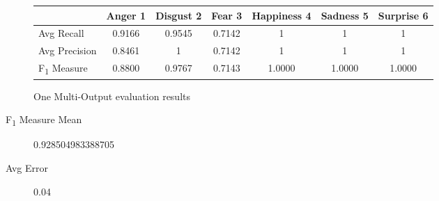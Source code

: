 \documentclass[a4paper,11pt]{article}
\begin{document}
 \begin{figure}[h]                                                               
 \begin{center}                                                                  
 \begin{tabular}{ | l || c | c | c | c | c | c | }                               
     \hline                                                                      
           							& Anger 1 & Disgust 2 & Fear 3 & Happiness 4 & Sadness 5 & Surprise 6 \\ \hline \hline
         Avg Recall 				& 0.9166 & 0.9545 & 0.7142 & 1 & 1 & 1 \\ \hline   
         Avg Precision 				& 0.8461 & 1 & 0.7142 & 1 & 1 & 1 \\ \hline
         F\textsubscript{1} Measure & 0.8800 & 0.9767 & 0.7143 &  1.0000 &  1.0000 & 1.0000 \\ \hline
     \end{tabular}                                                               
     \caption{One Multi-Output evaluation results}                                                
     \label{fig:averageRecall}                                                   
 \end{center}                                                                    
 \end{figure} 

\begin{description}
	\item[F\textsubscript{1} Measure Mean] 0.928504983388705
	\item[Avg Error] 0.04
\end{description}
\end{document}
